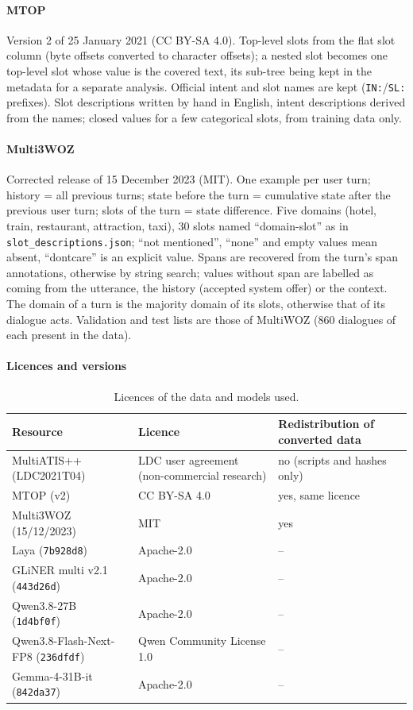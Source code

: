 \paragraph{MTOP} Version 2 of 25 January 2021 (CC BY-SA 4.0). Top-level slots from the flat slot column (byte offsets converted to character offsets); a nested slot becomes one top-level slot whose value is the covered text, its sub-tree being kept in the metadata for a separate analysis. Official intent and slot names are kept (\texttt{IN:}/\texttt{SL:} prefixes). Slot descriptions written by hand in English, intent descriptions derived from the names; closed values for a few categorical slots, from training data only.

\paragraph{Multi3WOZ} Corrected release of 15 December 2023 (MIT). One example per user turn; history = all previous turns; state before the turn = cumulative state after the previous user turn; slots of the turn = state difference. Five domains (hotel, train, restaurant, attraction, taxi), 30 slots named ``domain-slot'' as in \texttt{slot\_descriptions.json}; ``not mentioned'', ``none'' and empty values mean absent, ``dontcare'' is an explicit value. Spans are recovered from the turn's span annotations, otherwise by string search; values without span are labelled as coming from the utterance, the history (accepted system offer) or the context. The domain of a turn is the majority domain of its slots, otherwise that of its dialogue acts. Validation and test lists are those of MultiWOZ (860 dialogues of each present in the data).

\paragraph{Licences and versions}
\begin{table}[pos=h]
\centering
\small
\caption{Licences of the data and models used.}
\label{tab:licences}
\begin{tabular}{@{}p{5.0cm}p{5.1cm}p{5.1cm}@{}}
\toprule
Resource & Licence & Redistribution of converted data \\
\midrule
MultiATIS++ (LDC2021T04) & LDC user agreement (non-commercial research) & no (scripts and hashes only) \\
MTOP (v2) & CC BY-SA 4.0 & yes, same licence \\
Multi3WOZ (15/12/2023) & MIT & yes \\
Laya (\texttt{7b928d8}) & Apache-2.0 & -- \\
GLiNER multi v2.1 (\texttt{443d26d}) & Apache-2.0 & -- \\
Qwen3.8-27B (\texttt{1d4bf0f}) & Apache-2.0 & -- \\
Qwen3.8-Flash-Next-FP8 (\texttt{236dfdf}) & Qwen Community License 1.0 & -- \\
Gemma-4-31B-it (\texttt{842da37}) & Apache-2.0 & -- \\
\bottomrule
\end{tabular}
\end{table}

